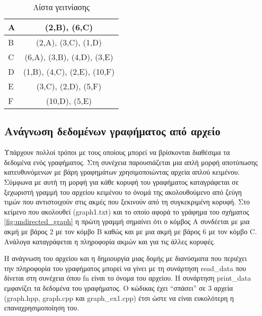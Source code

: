 \begin{table}[ht]
	\centering
	\begin{tabular}{|
		>{\columncolor[HTML]{C0C0C0}}l |c|}
		\hline
		A & (2,B), (6,C)                \\ \hline
		B & (2,A), (3,C), (1,D)         \\ \hline
		C & (6,A), (3,B), (4,D), (3,E)  \\ \hline
		D & (1,B), (4,C), (2,E), (10,F) \\ \hline
		E & (3,C), (2,D), (5,F)         \\ \hline
		F & (10,D), (5,E)               \\ \hline
	\end{tabular}
	\label{tbl:adjacency_list}
	\caption{Λίστα γειτνίασης}
\end{table}

\subsection{Ανάγνωση δεδομένων γραφήματος από αρχείο}
Υπάρχουν πολλοί τρόποι με τους οποίους μπορεί να βρίσκονται διαθέσιμα τα δεδομένα ενός γραφήματος. Στη συνέχεια παρουσιάζεται μια απλή μορφή αποτύπωσης κατευθυνόμενων με βάρη γραφημάτων χρησιμοποιώντας αρχεία απλού κειμένου. Σύμφωνα με αυτή τη μορφή για κάθε κορυφή του γραφήματος καταγράφεται σε ξεχωριστή γραμμή του αρχείου κειμένου το όνομά της ακολουθούμενο από ζεύγη τιμών που αντιστοιχούν στις ακμές που ξεκινούν από τη συγκεκριμένη κορυφή. Στο κείμενο που ακολουθεί (graph1.txt) και το οποίο αφορά το γράφημα του σχήματος \ref{fig:undirected_graph} η πρώτη γραμμή σημαίνει ότι ο κόμβος Α συνδέεται με μια ακμή με βάρος 2 με τον κόμβο B καθώς και με μια ακμή με βάρος 6 με τον κόμβο C. Ανάλογα καταγράφεται η πληροφορία ακμών και για τις άλλες κορυφές.



Η ανάγνωση του αρχείου και η δημιουργία μιας δομής με διανύσματα που περιέχει την πληροφορία του γραφήματος μπορεί να γίνει με τη συνάρτηση read\_data που δίνεται στη συνέχεια όπου fn είναι το όνομα του αρχείου. Η συνάρτηση print\_data εμφανίζει τα δεδομένα του γραφήματος. Ο κώδικας έχει ``σπάσει'' σε 3 αρχεία (graph.hpp, graph.cpp και graph\_ex1.cpp) έτσι ώστε να είναι ευκολότερη η επαναχρησιμοποίηση του.



